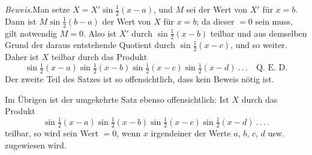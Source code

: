 \textit{Beweis.}\quad Man setze $X=X'\sin\tfrac12(x-a)$, und $M$ sei der Wert von $X'$ für $x=b$. Dann ist $M\sin\tfrac12(b-a)$ der Wert von $X$ für $x=b$; da dieser $=0$ sein muss, gilt notwendig $M=0$. Also ist $X'$ durch $\sin\tfrac12(x-b)$ teilbar und aus demselben Grund der daraus entstehende Quotient durch $\sin\tfrac12(x-c)$, und so weiter. Daher ist $X$ teilbar durch das Produkt
\[
\sin\tfrac12(x-a)\sin\tfrac12(x-b)\sin\tfrac12(x-c)\sin\tfrac12(x-d)\ .\,.\,.\quad\text{Q.~E.~D.}
\]
Der zweite Teil des Satzes ist so offensichtlich, dass kein Beweis nötig ist.

Im Übrigen ist der umgekehrte Satz ebenso offensichtlich: Ist $X$ durch das Produkt
\[
\sin\tfrac12(x-a)\sin\tfrac12(x-b)\sin\tfrac12(x-c)\sin\tfrac12(x-d)\ .\,.\,.\,.
\]
teilbar, so wird sein Wert $=0$, wenn $x$ irgendeiner der Werte $a$, $b$, $c$, $d$ usw. zugewiesen wird.

\endgroup

